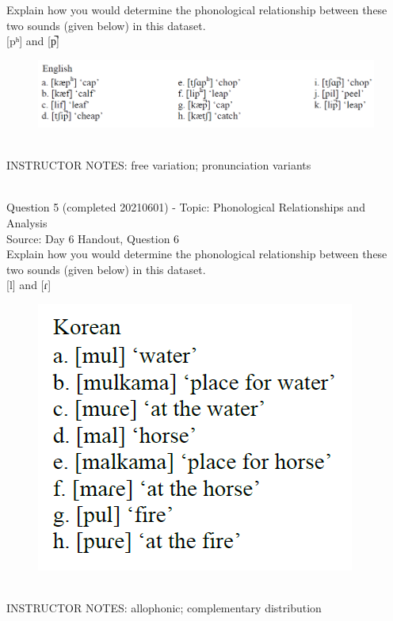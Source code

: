 \documentclass[12pt]{article}
\begin{document}
Explain how you would determine the phonological relationship between these two sounds (given below) in this dataset.\\

{[pʰ]} and {[p̚]}

\begin{figure}[H]
\includegraphics{../images/english_labials.png}
\end{figure}

~\\
INSTRUCTOR NOTES: free variation; pronunciation variants


~\\

{\large Question 5} (completed 20210601) - Topic: Phonological Relationships and Analysis\\
Source: Day 6 Handout, Question 6\\

Explain how you would determine the phonological relationship between these two sounds (given below) in this dataset.\\

{[l]} and {[ɾ]}

\begin{figure}[H]
\includegraphics{../images/korean.png}
\end{figure}

~\\
INSTRUCTOR NOTES: allophonic; complementary distribution
\end{document}
